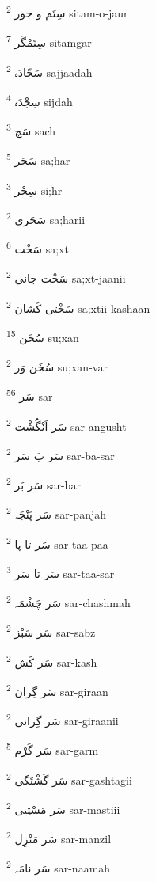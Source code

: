 \documentclass[12pt]{article}
\begin{document}
\begin{RTL}
\begin{multicols}{5}
{\ur سِتَم و جور}   \textsuperscript{2} sitam-o-jaur

{\ur سِتَمْگَر}   \textsuperscript{7} sitamgar

{\ur سَجّادَہ}   \textsuperscript{2} sajjaadah

{\ur سِجْدَہ}   \textsuperscript{4} sijdah

{\ur سَچ}   \textsuperscript{3} sach

{\ur سَحَر}   \textsuperscript{5} sa;har

{\ur سِحْر}   \textsuperscript{3} si;hr

{\ur سَحَری}   \textsuperscript{2} sa;harii

{\ur سَخْت}   \textsuperscript{6} sa;xt

{\ur سَخْت جانی}   \textsuperscript{2} sa;xt-jaanii

{\ur سَخْتی کَشان}   \textsuperscript{2} sa;xtii-kashaan

{\ur سُخَن}   \textsuperscript{15} su;xan

{\ur سُخَن وَر}   \textsuperscript{2} su;xan-var

{\ur سَر}   \textsuperscript{56} sar

{\ur سَر اَنْگُشْت}   \textsuperscript{2} sar-angusht

{\ur سَر بَ سَر}   \textsuperscript{2} sar-ba-sar

{\ur سَر بَر}   \textsuperscript{2} sar-bar

{\ur سَر پَنْجَہ}   \textsuperscript{2} sar-panjah

{\ur سَر تا پا}   \textsuperscript{2} sar-taa-paa

{\ur سَر تا سَر}   \textsuperscript{3} sar-taa-sar

{\ur سَر چَشْمَہ}   \textsuperscript{2} sar-chashmah

{\ur سَر سَبْز}   \textsuperscript{2} sar-sabz

{\ur سَر کَش}   \textsuperscript{2} sar-kash

{\ur سَر گِران}   \textsuperscript{2} sar-giraan

{\ur سَر گِرانی}   \textsuperscript{2} sar-giraanii

{\ur سَر گَرْم}   \textsuperscript{5} sar-garm

{\ur سَر گَشْتَگی}   \textsuperscript{2} sar-gashtagii

{\ur سَر مَسْتِیی}   \textsuperscript{2} sar-mastiii

{\ur سَر مَنْزِل}   \textsuperscript{2} sar-manzil

{\ur سَر نامَہ}   \textsuperscript{2} sar-naamah


\end{multicols}
\end{RTL}
\end{document}
